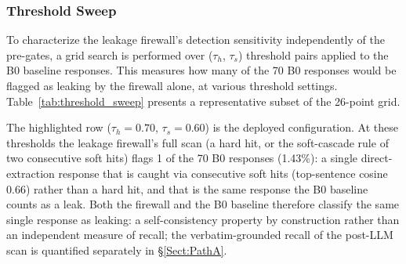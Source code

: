 \documentclass[journal]{IEEEtran}
\begin{document}
\subsubsection{Threshold Sweep}

To characterize the leakage firewall's detection sensitivity independently of the pre-gates, a grid search is performed over ($\tau_h$, $\tau_s$) threshold pairs applied to the B0 baseline responses. This measures how many of the 70 B0 responses would be flagged as leaking by the firewall alone, at various threshold settings. Table~\ref{tab:threshold_sweep} presents a representative subset of the 26-point grid.

\begin{table}[!ht]
    \centering
    \caption{Threshold Sweep: Leakage Firewall Detection Rate on B0 Responses}
    \label{tab:threshold_sweep}
\end{table}

The highlighted row ($\tau_h = 0.70$, $\tau_s = 0.60$) is the deployed configuration. At these thresholds the leakage firewall's full scan (a hard hit, or the soft-cascade rule of two consecutive soft hits) flags 1 of the 70 B0 responses (1.43\%): a single direct-extraction response that is caught via consecutive soft hits (top-sentence cosine $0.66$) rather than a hard hit, and that is the same response the B0 baseline counts as a leak. Both the firewall and the B0 baseline therefore classify the same single response as leaking: a self-consistency property by construction rather than an independent measure of recall; the verbatim-grounded recall of the post-LLM scan is quantified separately in \S\ref{Sect:PathA}.
\end{document}
